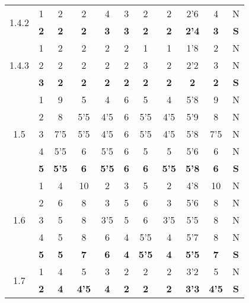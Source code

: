 \documentclass[11pt,a4paper,spanish,twoside]{report}
\begin{document}
\begin{table}[!h]
\begin{tabular}{|c|c||c|c|c|c|c||c|c|c||c|}
    \multirow{2}{*}{1.4.2} & 1 & 2 & 2 & 4 & 3 & 2 & 2 & 2'6 & 4 & N\\
    & \textbf{2} & \textbf{2} & \textbf{2} & \textbf{3} & \textbf{3} &
    \textbf{2} & \textbf{2} & \textbf{2'4} & \textbf{3} & \textbf{S} \\ 
    \hline

    \multirow{3}{*}{1.4.3} 
    & 1 & 2 & 2 & 2 & 2 & 1 & 1 & 1'8 & 2 & N \\
    & 2 & 2 & 2 & 2 & 2 & 3 & 2 & 2'2 & 3 & N \\
    & \textbf{3} & \textbf{2} & \textbf{2} & \textbf{2} & \textbf{2} &
    \textbf{2} & \textbf{2} & \textbf{2} & \textbf{2} & \textbf{S} \\ 
    \hline

    \multirow{5}{*}{1.5} 
    & 1 & 9   & 5   & 4   & 6 & 5   & 4   & 5'8 & 9   & N \\
    & 2 & 8   & 5'5 & 4'5 & 6 & 5'5 & 4'5 & 5'9 & 8   & N \\
    & 3 & 7'5 & 5'5 & 4'5 & 6 & 5'5 & 4'5 & 5'8 & 7'5 & N \\
    & 4 & 5'5 & 6   & 5'5 & 6 & 5   & 5   & 5'6 & 6   & N \\
    & \textbf{5} & \textbf{5'5} & \textbf{6} & \textbf{5'5} & \textbf{6} &
    \textbf{6} & \textbf{5'5} & \textbf{5'8} & \textbf{6} & \textbf{S} \\ 
    \hline

    \multirow{5}{*}{1.6} 
    & 1 & 4 & 10 & 2   & 3 & 5   & 2   & 4'8 & 10 & N \\
    & 2 & 6 & 8  & 3   & 5 & 6   & 3   & 5'6 & 8  & N \\
    & 3 & 5 & 8  & 3'5 & 5 & 6   & 3'5 & 5'5 & 8  & N \\
    & 4 & 5 & 8  & 6   & 4 & 5'5 & 4   & 5'7 & 8  & N \\
    & \textbf{5} & \textbf{5} & \textbf{7} & \textbf{6} & \textbf{4} &
    \textbf{5'5} & \textbf{4} & \textbf{5'5} & \textbf{7} & \textbf{S} \\ 
    \hline

    \multirow{2}{*}{1.7} & 1 & 4 & 5 & 3 & 2 & 2 & 2 & 3'2 & 5 & N \\
    & \textbf{2} & \textbf{4} & \textbf{4'5} & \textbf{4} & \textbf{2} &
    \textbf{2} & \textbf{2} & \textbf{3'3} & \textbf{4'5} & \textbf{S} \\ 
    \hline


\end{tabular}
\end{table}
\end{document}
